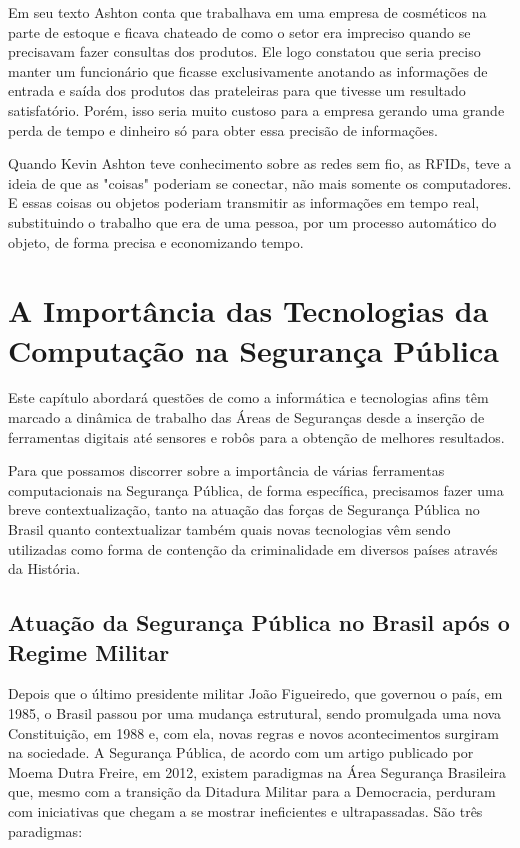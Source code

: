 Em seu texto Ashton conta que trabalhava em uma empresa de cosméticos na parte de estoque e ficava chateado de como o setor era impreciso quando se precisavam fazer consultas dos produtos. Ele logo constatou que seria preciso manter um funcionário que ficasse exclusivamente anotando as informações de entrada e saída dos produtos das prateleiras para que tivesse um resultado satisfatório. Porém, isso seria muito custoso para a empresa gerando uma grande perda de tempo e dinheiro só para obter essa precisão de informações. 

Quando Kevin Ashton teve conhecimento sobre as redes sem fio, as RFIDs, teve a ideia de que as "coisas" poderiam se conectar, não mais somente os computadores. E essas coisas ou objetos poderiam transmitir as informações em tempo real, substituindo o trabalho que era de uma pessoa, por um processo automático do objeto, de forma precisa e economizando tempo.


  

\chapter{A Importância das Tecnologias da Computação na Segurança Pública}

Este capítulo abordará questões de como a informática e tecnologias afins têm marcado a dinâmica de trabalho das Áreas de Seguranças desde a inserção de ferramentas digitais até sensores e robôs para a obtenção de melhores resultados.

Para que  possamos discorrer sobre a importância de várias ferramentas computacionais na Segurança Pública, de forma específica, precisamos fazer uma breve contextualização, tanto na atuação das forças de Segurança Pública no Brasil quanto contextualizar também quais novas tecnologias vêm sendo utilizadas como forma de contenção da criminalidade em diversos países através da História. 

\section{Atuação da Segurança Pública no Brasil após o Regime Militar}

Depois que o último presidente militar João Figueiredo, que governou o país, em 1985, o Brasil passou por uma mudança estrutural, sendo promulgada uma nova Constituição, em 1988 e, com ela, novas regras e novos acontecimentos surgiram na sociedade.
A Segurança Pública, de acordo com um artigo publicado por Moema Dutra Freire, em 2012, existem paradigmas na Área Segurança Brasileira que, mesmo com a transição da Ditadura Militar para a Democracia, perduram com iniciativas que chegam a se mostrar ineficientes e ultrapassadas. São três paradigmas:

